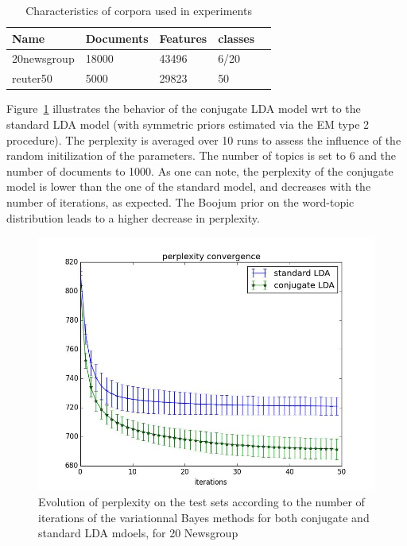 \begin{table}
    \begin{center}
        \begin{tabular}{ | l | l | l | l | p{5cm} |}
            \hline
            Name & Documents & Features & classes\\ \hline
            20newsgroup & 18000 & 43496 & 6/20 \\ \hline
            reuter50 & 5000 & 29823 & 50 \\ \hline
            \hline
        \end{tabular}
    \end{center}
    \caption{Characteristics of corpora used in experiments}
    \label{table:dataset}
\end{table}


Figure~\ref{fig:pp-exple} illustrates the behavior of the conjugate LDA model wrt to the standard LDA model (with symmetric priors estimated via the EM type 2 procedure). The perplexity is averaged over 10 runs to assess the influence of the random initilization of the parameters. The number of topics is set to 6 and the number of documents to 1000. As one can note, the perplexity of the conjugate model is lower than the one of the standard model, and decreases with the number of iterations, as expected. The Boojum prior on the word-topic distribution leads to a higher decrease in perplexity.

\begin{figure}[h]
\includegraphics[scale=0.4]{results/pp_conv}
\caption{Evolution of perplexity on the test sets according to the number of iterations of the variationnal Bayes methods for both conjugate and standard LDA mdoels, for 20 Newsgroup}
\label{fig:pp-exple}
\end{figure}


